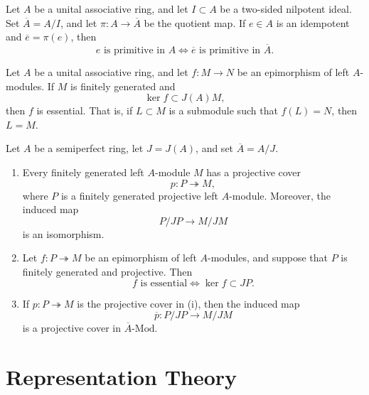 \begin{theorem} \label{thm:primitive-idempotent-lifting} 
    Let \(A\) be a unital associative ring, and let \(I\subset A\) be a two-sided nilpotent ideal. 
    Set \(\overline{A}=A/I\), and let \(\pi:A\to \overline{A}\) be the quotient map. If \(e\in A\) is an idempotent and \(\overline e=\pi(e)\), then \[ e \text{ is primitive in } A \Longleftrightarrow \overline e \text{ is primitive in } \overline A . \] 
\end{theorem}

\begin{lemma} \label{lem:essential-epimorphism-nakayama} 
    Let \(A\) be a unital associative ring, and let \(f:M\to N\) be an epimorphism of left \(A\)-modules. If \(M\) is finitely generated and \[ \ker f\subset J(A)M, \] then \(f\) is essential. That is, if \(L\subset M\) is a submodule such that \(f(L)=N\), then \(L=M\). 
\end{lemma}


\begin{theorem}
\label{thm:projective-covers-over-semiperfect-rings}
Let \(A\) be a semiperfect ring, let \(J=J(A)\), and set
\(\overline A=A/J\).

\begin{enumerate}
    \item[(i)] Every finitely generated left \(A\)-module \(M\) has a
    projective cover
    \[
    p:P\twoheadrightarrow M,
    \]
    where \(P\) is a finitely generated projective left \(A\)-module. Moreover,
    the induced map
    \[
    P/JP\longrightarrow M/JM
    \]
    is an isomorphism.

    \item[(ii)] Let \(f:P\twoheadrightarrow M\) be an epimorphism of left
    \(A\)-modules, and suppose that \(P\) is finitely generated and
    projective. Then
    \[
    f \text{ is essential}
    \Longleftrightarrow
    \ker f\subset JP.
    \]

    \item[(iii)] If \(p:P\twoheadrightarrow M\) is the projective cover in
    \textup{(i)}, then the induced map
    \[
    \overline p:P/JP\longrightarrow M/JM
    \]
    is a projective cover in \(\overline A\text{-}\mathrm{Mod}\).
\end{enumerate}
\end{theorem}

\section{Representation Theory}

